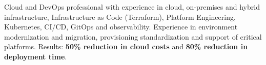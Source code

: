 
\begin{cvparagraph}

Cloud and DevOps professional with experience in cloud, on-premises and hybrid infrastructure, Infrastructure as Code (Terraform), Platform Engineering, Kubernetes, CI/CD, GitOps and observability. Experience in environment modernization and migration, provisioning standardization and support of critical platforms. Results: \textbf{50\% reduction in cloud costs} and \textbf{80\% reduction in deployment time}.

\end{cvparagraph}
